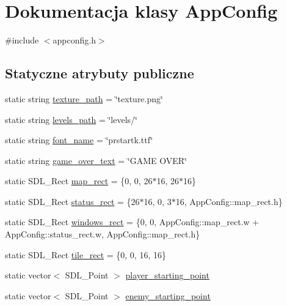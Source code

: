 \hypertarget{class_app_config}{}\section{Dokumentacja klasy App\+Config}
\label{class_app_config}


{\ttfamily \#include $<$appconfig.\+h$>$}

\subsection*{Statyczne atrybuty publiczne}
\begin{DoxyCompactItemize}
\item 
static string \hyperlink{class_app_config_a65465439dccccead6f012308c44a4c69}{texture\+\_\+path} = \char`\"{}texture.\+png\char`\"{}
\item 
static string \hyperlink{class_app_config_a381fc79705578228b73a1d182f6264f0}{levels\+\_\+path} = \char`\"{}levels/\char`\"{}
\item 
static string \hyperlink{class_app_config_a8791b4aad5b035b27ce6bbc8c519b586}{font\+\_\+name} = \char`\"{}prstartk.\+ttf\char`\"{}
\item 
static string \hyperlink{class_app_config_a11efeaaa7242d7e57feee9ad5846f099}{game\+\_\+over\+\_\+text} = \char`\"{}G\+A\+M\+E O\+V\+E\+R\char`\"{}
\item 
static S\+D\+L\+\_\+\+Rect \hyperlink{class_app_config_ae2ae8d61b42619876e21e008cdabc7e0}{map\+\_\+rect} = \{0, 0, 26$\ast$16, 26$\ast$16\}
\item 
static S\+D\+L\+\_\+\+Rect \hyperlink{class_app_config_a6aa81e994502bb576cb7a203c9230a61}{status\+\_\+rect} = \{26$\ast$16, 0, 3$\ast$16, App\+Config\+::map\+\_\+rect.\+h\}
\item 
static S\+D\+L\+\_\+\+Rect \hyperlink{class_app_config_a3084e1368b670ab054843b2adf17c1b8}{windows\+\_\+rect} = \{0, 0, App\+Config\+::map\+\_\+rect.\+w + App\+Config\+::status\+\_\+rect.\+w, App\+Config\+::map\+\_\+rect.\+h\}
\item 
static S\+D\+L\+\_\+\+Rect \hyperlink{class_app_config_a0b948189431fbfb94ae6de07099b8c27}{tile\+\_\+rect} = \{0, 0, 16, 16\}
\item 
static vector$<$ S\+D\+L\+\_\+\+Point $>$ \hyperlink{class_app_config_a142c3a4707dab014b2056e426d77a67d}{player\+\_\+starting\+\_\+point}
\item 
static vector$<$ S\+D\+L\+\_\+\+Point $>$ \hyperlink{class_app_config_a3ff8c966e47fe083d3c05efe171f35f7}{enemy\+\_\+starting\+\_\+point}

\end{DoxyCompactItemize}
